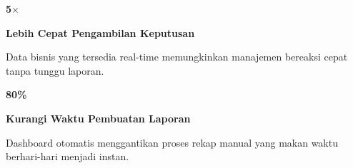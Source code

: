 \documentclass[a4paper]{article}
\begin{document}
\noindent
\begin{minipage}[t]{0.485\textwidth}
    \noindent\colorbox{BlueBg}{%
        \begin{minipage}[t][2.7cm][c]{\dimexpr\linewidth-2\fboxsep\relax}
            \centering
            {\fontsize{20}{24}\selectfont\bfseries\color{IndigoPrimary} 5$\times$}\par\vspace{2pt}
            {\fontsize{9.5}{12}\selectfont\bfseries\color{BlueDark} Lebih Cepat Pengambilan Keputusan}\par\vspace{2pt}
            {\fontsize{8.5}{11}\selectfont\color{TextDark}Data bisnis yang tersedia real-time memungkinkan manajemen bereaksi cepat tanpa tunggu laporan.}
        \end{minipage}}\par
    \vspace{6pt}
    \noindent\colorbox{BlueBg}{%
        \begin{minipage}[t][2.7cm][c]{\dimexpr\linewidth-2\fboxsep\relax}
            \centering
            {\fontsize{20}{24}\selectfont\bfseries\color{IndigoPrimary} 80\%}\par\vspace{2pt}
            {\fontsize{9.5}{12}\selectfont\bfseries\color{BlueDark} Kurangi Waktu Pembuatan Laporan}\par\vspace{2pt}
            {\fontsize{8.5}{11}\selectfont\color{TextDark}Dashboard otomatis menggantikan proses rekap manual yang makan waktu berhari-hari menjadi instan.}
        \end{minipage}}%
\end{minipage}%
\hfill
\end{document}
